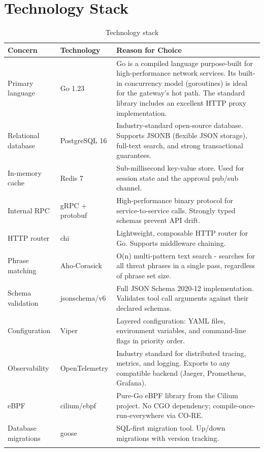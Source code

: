 \documentclass[12pt,a4paper]{report}
\begin{document}
\chapter{Technology Stack}

\begin{longtable}{p{3.5cm} p{3.5cm} p{7cm}}
  \toprule
  \textbf{Concern} & \textbf{Technology} & \textbf{Reason for Choice} \\
  \midrule
  \endhead
  Primary language & Go 1.23 &
    Go is a compiled language purpose-built for high-performance network
    services. Its built-in concurrency model (goroutines) is ideal for the
    gateway's hot path. The standard library includes an excellent HTTP
    proxy implementation. \\[4pt]
  Relational database & PostgreSQL 16 &
    Industry-standard open-source database. Supports JSONB (flexible JSON
    storage), full-text search, and strong transactional guarantees. \\[4pt]
  In-memory cache & Redis 7 &
    Sub-millisecond key-value store. Used for session state and the
    approval pub/sub channel. \\[4pt]
  Internal RPC & gRPC + protobuf &
    High-performance binary protocol for service-to-service calls.
    Strongly typed schemas prevent API drift. \\[4pt]
  HTTP router & chi &
    Lightweight, composable HTTP router for Go. Supports middleware
    chaining. \\[4pt]
  Phrase matching & Aho-Corasick &
    O(n) multi-pattern text search - searches for all threat phrases
    in a single pass, regardless of phrase set size. \\[4pt]
  Schema validation & jsonschema/v6 &
    Full JSON Schema 2020-12 implementation. Validates tool call
    arguments against their declared schemas. \\[4pt]
  Configuration & Viper &
    Layered configuration: YAML files, environment variables, and
    command-line flags in priority order. \\[4pt]
  Observability & OpenTelemetry &
    Industry standard for distributed tracing, metrics, and logging.
    Exports to any compatible backend (Jaeger, Prometheus, Grafana). \\[4pt]
  eBPF & cilium/ebpf &
    Pure-Go eBPF library from the Cilium project. No CGO dependency;
    compile-once-run-everywhere via CO-RE. \\[4pt]
  Database migrations & goose &
    SQL-first migration tool. Up/down migrations with version tracking. \\[4pt]
  \bottomrule
  \caption{Technology stack}
\end{longtable}
\end{document}
